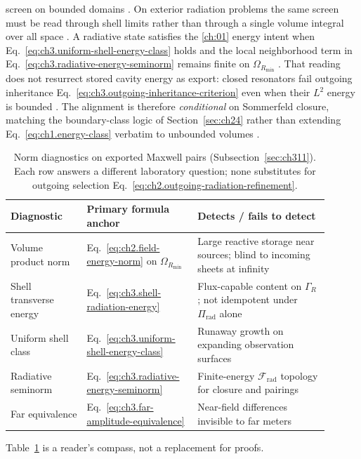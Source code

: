 screen on bounded domains \cite{stratton1941}. On exterior radiation problems the same screen must be read
through shell limits rather than through a single volume integral over all space
\cite{harrington2001}. A radiative state satisfies the \ref{ch:01} energy intent when
Eq.~\eqref{eq:ch3.uniform-shell-energy-class} holds and the local neighborhood term in
Eq.~\eqref{eq:ch3.radiative-energy-seminorm} remains finite on \(\Omega_{R_{\min}}\) \cite{stratton1941}.
That reading does not resurrect stored cavity energy as export: closed resonators fail outgoing inheritance
Eq.~\eqref{eq:ch3.outgoing-inheritance-criterion} even when their \(L^{2}\) energy is bounded
\cite{harrington2001}. The alignment is therefore \emph{conditional} on Sommerfeld closure, matching the
boundary-class logic of Section~\ref{sec:ch24} rather than extending Eq.~\eqref{eq:ch1.energy-class}
verbatim to unbounded volumes \cite{stratton1941}.
\begin{table}[t]
\centering
\caption{Norm diagnostics on exported Maxwell pairs (Subsection~\ref{sec:ch311}). Each row answers a
different laboratory question; none substitutes for outgoing selection
Eq.~\eqref{eq:ch2.outgoing-radiation-refinement}.}
\label{tab:ch3.radiative-norm-diagnostic}
\small
\begin{tabular}{@{}p{0.22\linewidth}p{0.30\linewidth}p{0.38\linewidth}@{}}
\toprule
Diagnostic & Primary formula anchor & Detects / fails to detect \\
\midrule
Volume product norm &
Eq.~\eqref{eq:ch2.field-energy-norm} on \(\Omega_{R_{\min}}\) &
Large reactive storage near sources; blind to incoming sheets at infinity \\
\addlinespace
Shell transverse energy &
Eq.~\eqref{eq:ch3.shell-radiation-energy} &
Flux-capable content on \(\Gamma_R\); not idempotent under \(\Pi_{\mathrm{rad}}\) alone \\
\addlinespace
Uniform shell class &
Eq.~\eqref{eq:ch3.uniform-shell-energy-class} &
Runaway growth on expanding observation surfaces \\
\addlinespace
Radiative seminorm &
Eq.~\eqref{eq:ch3.radiative-energy-seminorm} &
Finite-energy \(\mathcal{F}_{\mathrm{rad}}\) topology for closure and pairings \\
\addlinespace
Far equivalence &
Eq.~\eqref{eq:ch3.far-amplitude-equivalence} &
Near-field differences invisible to far meters \\
\bottomrule
\end{tabular}
\end{table}
Table~\ref{tab:ch3.radiative-norm-diagnostic} is a reader's compass, not a replacement for proofs.
